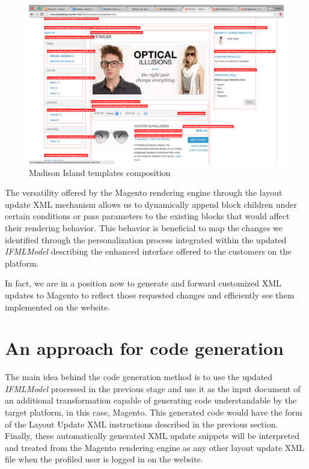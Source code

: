 \vspace{0.5cm}
\begin{figure}[H]
  \centering
    \includegraphics[width=14cm]{images/magento/madison-island-theme.png}
  \caption{Madison Island templates composition}
  \label{fig:magento-madison-island-theme}
\end{figure}
\vspace{0.5cm}

The versatility offered by the Magento rendering engine through the layout update XML mechanism allows us to dynamically append block children under certain conditions or pass parameters to the existing blocks that would affect their rendering behavior. This behavior is beneficial to map the changes we identified through the personalization process integrated within the updated \textit{IFMLModel} describing the enhanced interface offered to the customers on the platform.

In fact, we are in a position now to generate and forward customized XML updates to Magento to reflect those requested changes and efficiently see them implemented on the website.

\newpage
\section{An approach for code generation}

The main idea behind the code generation method is to use the updated \textit{IFMLModel} processed in the previous stage and use it as the input document of an additional transformation capable of generating code understandable by the target platform, in this case, Magento. This generated code would have the form of the Layout Update XML instructions described in the previous section. Finally, these automatically generated XML update snippets will be interpreted and treated from the Magento rendering engine as any other layout update XML file when the profiled user is logged in on the website.

